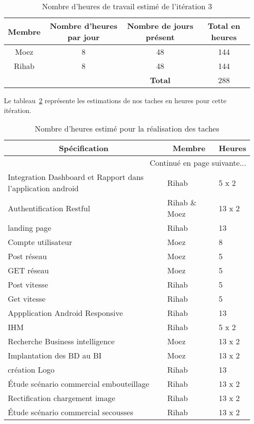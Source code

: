 \begin{table}[htbp]
    \centering
    \begin{tabular}{| c | c | c | c |}
\hline
\textbf{Membre} & \textbf{Nombre d'heures par jour} & \textbf{Nombre de jours présent} & \textbf{Total en heures} \\ \hline
\hline

Moez & 8 & 48 & 144\\ \hline
Rihab & 8 & 48 & 144 \\ \hline
\multicolumn{2}{c|}{} & \textbf{Total} & 288 \\ \cline{3-4}
    \end{tabular}
    \caption{Nombre d'heures de travail estimé de l'itération 3}
    \label{tab:sprint3-capacity}
\end{table}

Le tableau~\ref{tab:sprint3-estimation} représente les estimations de nos taches
en heures pour cette itération.

\begin{center}
    \begin{longtable}{| l | l | l |}
        \caption{Nombre d'heures estimé pour la réalisation des taches}
        \label{tab:sprint3-estimation} \\

 \hline
 \multicolumn{1}{|c}{\textbf{Spécification}} &
 \multicolumn{1}{|c}{\textbf{Membre}} &
 \multicolumn{1}{|c|}{\textbf{Heures}} \\ \hline
 \endhead

 \hline \multicolumn{3}{|r|}{{Continué en page suivante$\dotsc$}} \\ \hline
 \endfoot

 \hline \hline
 \endlastfoot

\hline
Integration Dashboard et Rapport dans l'application android & Rihab & 5 x 2 \\ \hline
Authentification Restful& Rihab \& Moez & 13 x 2 \\ \hline
landing page& Rihab & 13 \\ \hline
Compte utilisateur& Moez & 8 \\ \hline
Post réseau& Moez & 5  \\ \hline
GET réseau& Moez & 5  \\ \hline
Post vitesse& Rihab & 5  \\ \hline
Get vitesse& Rihab & 5  \\ \hline
Appplication Android Responsive & Rihab & 13 \\ \hline
IHM & Rihab & 5 x 2 \\ \hline
Recherche Business intelligence& Moez & 13 x 2 \\ \hline
Implantation des BD au BI& Moez & 13 x 2 \\ \hline
création Logo& Rihab & 13 \\ \hline
Étude scénario commercial embouteillage& Rihab & 13 x 2 \\ \hline
Rectification chargement image & Rihab & 13 x 2 \\ \hline
Étude scénario commercial secousses & Rihab & 13 x 2 \\ \hline
\end{longtable}
\end{center}

